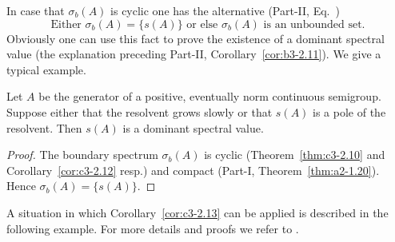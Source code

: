 In case that $\sigma_{b}(A)$ is cyclic one has the alternative (\cf Part-II, Eq.~)
\[
\text{Either $\sigma_{b}(A) = \{s(A)\}$ or else $\sigma_{b}(A)$ is an unbounded set.}
\]
Obviously one can use this fact to prove the existence of a dominant spectral value (\cf the explanation preceding Part-II, Corollary~\ref{cor:b3-2.11}).
We give a typical example.
\begin{corollary}\label{cor:c3-2.13}
	Let $A$ be the generator of a positive, eventually norm continuous semigroup.
	Suppose either that the resolvent grows slowly or that $s(A)$ is a pole of the resolvent.
	Then $s(A)$ is a dominant spectral value.%
\end{corollary}
\begin{proof}
The boundary spectrum $\sigma_{b}(A)$ is cyclic (Theorem~\ref{thm:c3-2.10} and Corollary~\ref{cor:c3-2.12} resp.) and compact (Part-I, Theorem~\ref{thm:a2-1.20}).
Hence $\sigma_{b}(A) = \{s(A)\}$.
\end{proof}
A situation in which Corollary~\ref{cor:c3-2.13} can be applied is described in the following example.
For more details and proofs we refer to \textcite{amann:1983}.
